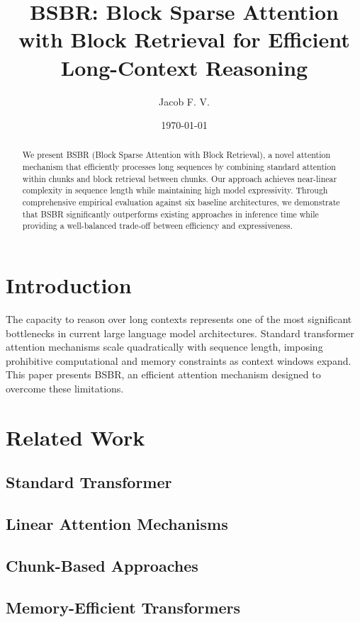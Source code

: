 \documentclass[12pt]{article}
\title{BSBR: Block Sparse Attention with Block Retrieval for Efficient Long-Context Reasoning}
\author{Jacob F. V.}
\date{\today}
\begin{document}
\maketitle

\begin{abstract}
We present BSBR (Block Sparse Attention with Block Retrieval), a novel attention mechanism that efficiently processes long sequences by combining standard attention within chunks and block retrieval between chunks. Our approach achieves near-linear complexity in sequence length while maintaining high model expressivity. Through comprehensive empirical evaluation against six baseline architectures, we demonstrate that BSBR significantly outperforms existing approaches in inference time while providing a well-balanced trade-off between efficiency and expressiveness.
\end{abstract}

\section{Introduction}
\label{sec:introduction}

The capacity to reason over long contexts represents one of the most significant bottlenecks in current large language model architectures. Standard transformer attention mechanisms \cite{vaswani2017attention} scale quadratically with sequence length, imposing prohibitive computational and memory constraints as context windows expand. This paper presents BSBR, an efficient attention mechanism designed to overcome these limitations.

\section{Related Work}
\label{sec:related_work}

\subsection{Standard Transformer}
\subsection{Linear Attention Mechanisms}
\subsection{Chunk-Based Approaches}
\subsection{Memory-Efficient Transformers}
\end{document}
